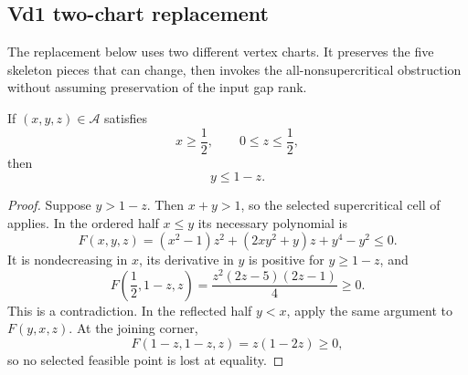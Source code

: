 
\FloatBarrier



\subsection{Vd1 two-chart replacement}

The replacement below uses two different vertex charts.  It preserves the
five skeleton pieces that can change, then invokes the all-nonsupercritical
obstruction without assuming preservation of the input gap rank.

\begin{lemma}
\label{lem:appendix-half-square-admissibility}
If \((x,y,z)\in\mathcal A\) satisfies
\[
 x\ge\frac12,
 \qquad
 0\le z\le\frac12,
\]
then
\[
 y\le1-z.
\]
\end{lemma}

\begin{proof}
Suppose \(y>1-z\).  Then \(x+y>1\), so the selected supercritical cell of
 applies.  In the ordered half \(x\le y\)
its necessary polynomial is
\[
 F(x,y,z)=
 (x^2-1)z^2+(2xy^2+y)z+y^4-y^2\le0.
\]
It is nondecreasing in \(x\), its derivative in \(y\) is positive for
\(y\ge1-z\), and
\[
 F\left(\frac12,1-z,z\right)
 =\frac{z^2(2z-5)(2z-1)}4\ge0.
\]
This is a contradiction.  In the reflected half \(y<x\), apply the same
argument to \(F(y,x,z)\).  At the joining corner,
\[
 F(1-z,1-z,z)=z(1-2z)\ge0,
\]
so no selected feasible point is lost at equality.
\end{proof}

